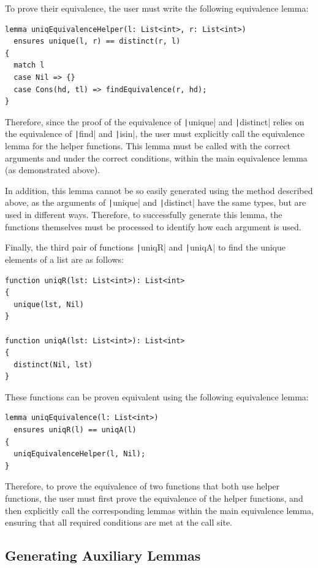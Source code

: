 To prove their equivalence, the user must write the following equivalence lemma:
\begin{verbatim}
lemma uniqEquivalenceHelper(l: List<int>, r: List<int>)
  ensures unique(l, r) == distinct(r, l)
{
  match l
  case Nil => {}
  case Cons(hd, tl) => findEquivalence(r, hd);
}
\end{verbatim}
%

Therefore, since the proof of the equivalence of \texttt|unique| and \texttt|distinct| relies on the equivalence of \texttt|find| and \texttt|isin|, the user must explicitly call the equivalence lemma for the helper functions. This lemma must be called with the correct arguments and under the correct conditions, within the main equivalence lemma (as demonstrated above).

In addition, this lemma cannot be so easily generated using the method described above, as the arguments of \texttt|unique| and \texttt|distinct| have the same types, but are used in different ways. Therefore, to successfully generate this lemma, the functions themselves must be processed to identify how each argument is used.

Finally, the third pair of functions \texttt|uniqR| and \texttt|uniqA| to find the unique elements of a list are as follows:

\begin{verbatim}
function uniqR(lst: List<int>): List<int>
{
  unique(lst, Nil)
}

function uniqA(lst: List<int>): List<int>
{
  distinct(Nil, lst)
}
\end{verbatim}
%
These functions can be proven equivalent using the following equivalence lemma:
\begin{verbatim}
lemma uniqEquivalence(l: List<int>)
  ensures uniqR(l) == uniqA(l)
{
  uniqEquivalenceHelper(l, Nil);
}
\end{verbatim}
%

Therefore, to prove the equivalence of two functions that both use helper functions, the user must first prove the equivalence of the helper functions, and then explicitly call the corresponding lemmas within the main equivalence lemma, ensuring that all required conditions are met at the call site.

\subsection{Generating Auxiliary Lemmas}\label{sec:auxiliary-lemmas}

